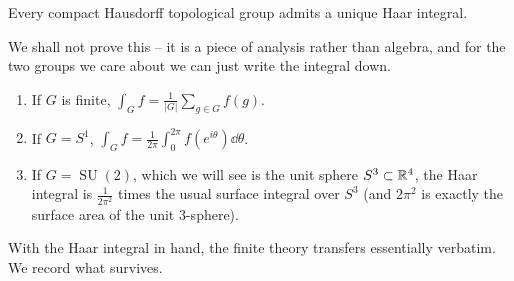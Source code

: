 \documentclass[a4paper]{scrartcl}
\newcommand{\SU}{\operatorname{SU}}
\begin{document}
\begin{theorem}
	Every compact Hausdorff topological group admits a unique Haar integral.
\end{theorem}

We shall not prove this -- it is a piece of analysis rather than algebra, and for the two groups we care about we can just write the integral down.

\begin{example}
	\begin{enumerate}[label=(\roman*)]
		\item If $G$ is finite, $\int_Gf = \frac1{|G|}\sum_{g\in G}f(g)$.
		\item If $G = S^1$, $\displaystyle\int_Gf = \frac1{2\pi}\int_0^{2\pi}f(e^{i\theta})\dd\theta$.
		\item If $G = \SU(2)$, which we will see is the unit sphere $S^3\subset\mathbb{R}^4$, the Haar integral is $\frac{1}{2\pi^2}$ times the usual surface integral over $S^3$ (and $2\pi^2$ is exactly the surface area of the unit $3$-sphere).
	\end{enumerate}
\end{example}

With the Haar integral in hand, the finite theory transfers essentially verbatim. We record what survives.
\end{document}
